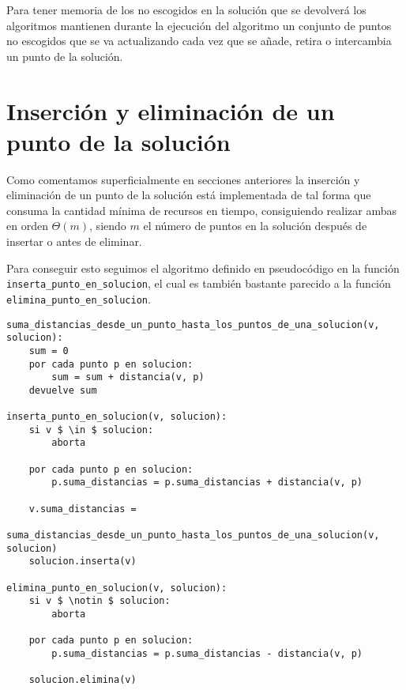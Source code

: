 Para tener memoria de los no escogidos en la solución que se devolverá los algoritmos mantienen durante la ejecución del algoritmo un
conjunto de puntos no escogidos que se va actualizando cada vez que se añade, retira o intercambia un punto de la solución.

\section{Inserción y eliminación de un punto de la solución}

Como comentamos superficialmente en secciones anteriores la inserción y eliminación de un punto de la solución está implementada de tal
forma que consuma la cantidad mínima de recursos en tiempo, consiguiendo realizar ambas en orden $ \Theta(m) $, siendo $ m $ el 
número de puntos en la solución después de insertar o antes de eliminar.

Para conseguir esto seguimos el algoritmo definido en pseudocódigo en la función \texttt{inserta\_punto\_en\_solucion}, el cual es también bastante parecido
a la función \texttt{elimina\_punto\_en\_solucion}.

\begin{minipage}{\textwidth}
\begin{lstlisting}[mathescape=true]
suma_distancias_desde_un_punto_hasta_los_puntos_de_una_solucion(v, solucion):
    sum = 0
    por cada punto p en solucion:
        sum = sum + distancia(v, p)
    devuelve sum

inserta_punto_en_solucion(v, solucion):
    si v $ \in $ solucion:
        aborta

    por cada punto p en solucion:
        p.suma_distancias = p.suma_distancias + distancia(v, p)
    
    v.suma_distancias =
        suma_distancias_desde_un_punto_hasta_los_puntos_de_una_solucion(v, solucion)
    solucion.inserta(v)

elimina_punto_en_solucion(v, solucion):
    si v $ \notin $ solucion:
        aborta
    
    por cada punto p en solucion:
        p.suma_distancias = p.suma_distancias - distancia(v, p)
    
    solucion.elimina(v)
\end{lstlisting}
\end{minipage}